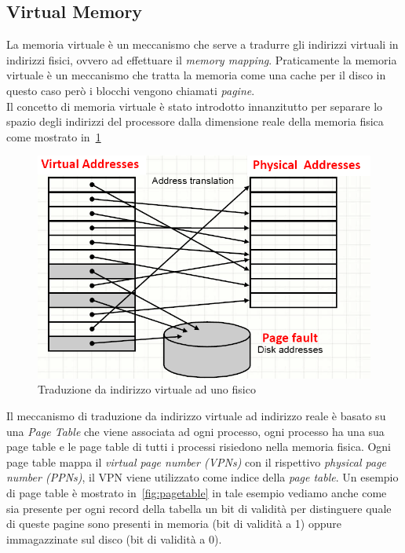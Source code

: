 \subsection{Virtual Memory}
La memoria virtuale è un meccanismo che serve a tradurre gli indirizzi virtuali in indirizzi fisici, ovvero ad effettuare il \emph{memory mapping}. Praticamente la memoria virtuale è un meccanismo che tratta la memoria come una cache per il disco in questo caso però i blocchi vengono chiamati \emph{pagine}.\\
Il concetto di memoria virtuale è stato introdotto innanzitutto per separare lo spazio degli indirizzi del processore dalla dimensione reale della memoria fisica come mostrato in \figurename\,\ref{fig:virtualtrans}
\begin{figure}
\centering
\includegraphics[scale=0.4]{img/virtualtrans.png}
\caption{Traduzione da indirizzo virtuale ad uno fisico}\label{fig:virtualtrans}
\end{figure}
Il meccanismo di traduzione da indirizzo virtuale ad indirizzo reale è basato su una \emph{Page Table} che viene associata ad ogni processo, ogni processo ha una sua page table e le page table di tutti i processi risiedono nella memoria fisica. Ogni page table mappa il \emph{virtual page number (VPNs)} con il rispettivo \emph{physical page number (PPNs)}, il VPN viene utilizzato come indice della \emph{page table}. Un esempio di page table è mostrato in \figurename\,\ref{fig:pagetable} in tale esempio vediamo anche come sia presente per ogni record della tabella un bit di validità per distinguere quale di queste pagine sono presenti in memoria (bit di validità a 1) oppure immagazzinate sul disco (bit di validità a 0).
